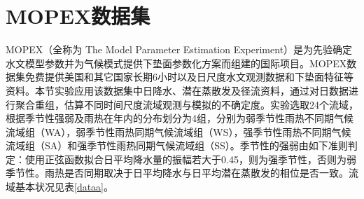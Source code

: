 \section{MOPEX数据集}
MOPEX（全称为 The Model Parameter Estimation Experiment）是为先验确定水文模型参数并为气候模式提供下垫面参数化方案而组建的国际项目\citep{duan2006model}。MOPEX数据集免费提供美国和其它国家长期6小时以及日尺度水文观测数据和下垫面特征等资料。本节实验应用该数据集中日降水、潜在蒸散发及径流资料，通过对日数据进行聚合重组，估算不同时间尺度流域观测与模拟的不确定度。实验选取24个流域，根据季节性强弱及雨热在年内的分布划分为4组，分别为弱季节性雨热不同期气候流域组（WA），弱季节性雨热同期气候流域组（WS），强季节性雨热不同期气候流域组（SA）和强季节性雨热同期气候流域组（SS）。季节性的强弱由如下准则判定：使用正弦函数拟合日平均降水量的振幅若大于0.45，则为强季节性，否则为弱季节性。雨热是否同期取决于日平均降水与日平均潜在蒸散发的相位是否一致。流域基本状况见表\ref{dataa}。


